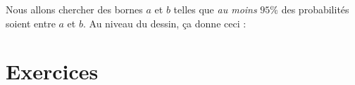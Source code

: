 Nous allons chercher des bornes \( a\) et \( b\) telles que \emph{au moins} \( 95\%\) des probabilités soient entre \( a\) et \( b\). Au niveau du dessin, ça donne ceci :


\section{Exercices}

